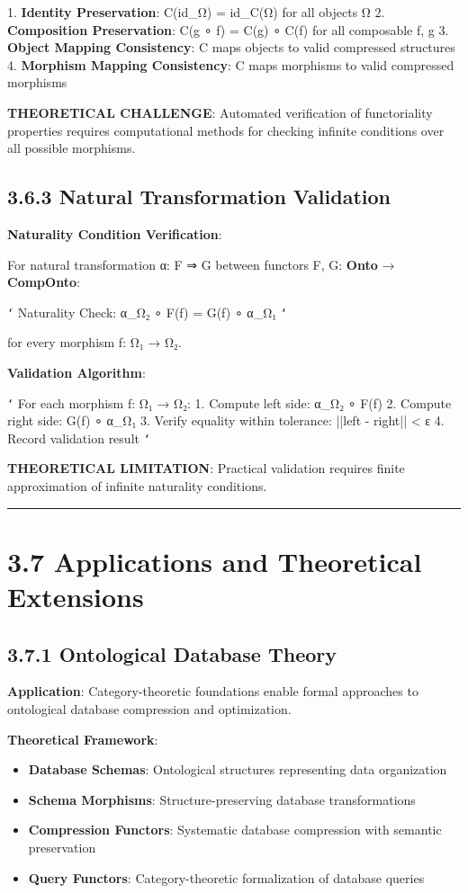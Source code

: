1. \textbf{Identity Preservation}: C(id_Ω) = id_{C(Ω)} for all objects Ω
2. \textbf{Composition Preservation}: C(g ∘ f) = C(g) ∘ C(f) for all composable f, g
3. \textbf{Object Mapping Consistency}: C maps objects to valid compressed structures
4. \textbf{Morphism Mapping Consistency}: C maps morphisms to valid compressed morphisms

\textbf{THEORETICAL CHALLENGE}: Automated verification of functoriality properties requires computational methods for checking infinite conditions over all possible morphisms.

\subsection{3.6.3 Natural Transformation Validation}

\textbf{Naturality Condition Verification}:

For natural transformation α: F ⇒ G between functors F, G: \textbf{Onto} → \textbf{CompOnto}:

\texttt{`}
Naturality Check: α_{Ω₂} ∘ F(f) = G(f) ∘ α_{Ω₁}
\texttt{`}

for every morphism f: Ω₁ → Ω₂.

\textbf{Validation Algorithm}:

\texttt{`}
For each morphism f: Ω₁ → Ω₂:
1. Compute left side: α_{Ω₂} ∘ F(f)
2. Compute right side: G(f) ∘ α_{Ω₁}
3. Verify equality within tolerance: ||left - right|| < ε
4. Record validation result
\texttt{`}

\textbf{THEORETICAL LIMITATION}: Practical validation requires finite approximation of infinite naturality conditions.

\hrule

\section{3.7 Applications and Theoretical Extensions}

\subsection{3.7.1 Ontological Database Theory}

\textbf{Application}: Category-theoretic foundations enable formal approaches to ontological database compression and optimization.

\textbf{Theoretical Framework}:
\begin{itemize}
\item \textbf{Database Schemas}: Ontological structures representing data organization
\item \textbf{Schema Morphisms}: Structure-preserving database transformations
\item \textbf{Compression Functors}: Systematic database compression with semantic preservation
\item \textbf{Query Functors}: Category-theoretic formalization of database queries
\end{itemize}

